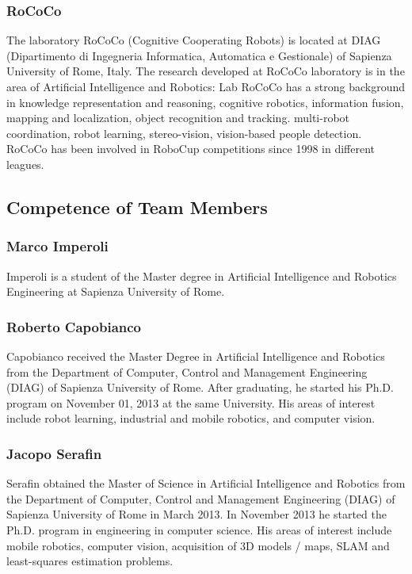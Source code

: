 \documentclass[conference]{IEEEtran}
\begin{document}
\subsubsection{RoCoCo} The laboratory RoCoCo (Cognitive Cooperating Robots) is located at DIAG (Dipartimento di Ingegneria Informatica, Automatica e Gestionale) of Sapienza University of Rome, Italy.
The research developed at RoCoCo laboratory is in the area of Artificial Intelligence and Robotics: Lab RoCoCo has a strong background in knowledge representation and reasoning, cognitive robotics, information fusion, mapping and localization, object recognition and tracking. multi-robot coordination, robot learning, stereo-vision, vision-based people detection. RoCoCo has been involved in RoboCup competitions since 1998 in different leagues.\\

\subsection{Competence of Team Members}

\subsubsection*{Marco Imperoli}
Imperoli is a student of the Master degree in Artificial Intelligence and Robotics Engineering at Sapienza University of Rome.
\subsubsection*{Roberto Capobianco}
Capobianco received the Master Degree in Artificial Intelligence and Robotics from the Department of Computer, 
Control and Management Engineering (DIAG) of Sapienza University of Rome. 
After graduating, he started his Ph.D. program on November 01, 2013 at the same University. His areas of interest include robot learning, industrial and mobile robotics, and computer vision.
\subsubsection*{Jacopo Serafin}
Serafin obtained the Master of Science in Artificial Intelligence and Robotics from the Department of Computer, Control and Management Engineering (DIAG) of Sapienza University of Rome in March 2013. 
In November 2013 he started the Ph.D. program in engineering in computer science. His areas of interest include mobile robotics, computer vision, acquisition of 3D models / maps, SLAM and least-squares estimation problems.
\end{document}
